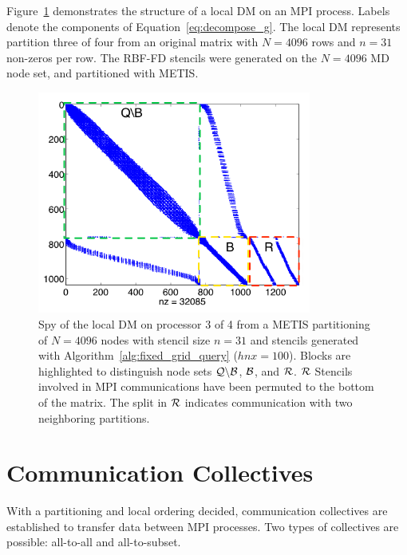 \documentclass{report}
\begin{document}
Figure~\ref{fig:decomp_spy} demonstrates the structure of a local DM on an MPI process. Labels denote the components of Equation~\ref{eq:decompose_g}. The local DM represents partition three of four from an original matrix with $N=4096$ rows and $n=31$ non-zeros per row. The RBF-FD stencils were generated on the $N=4096$ MD node set, and partitioned with METIS. 
\begin{figure}
\begin{center}
\includegraphics[width=9cm]{rbffd_methods_content/decompositions/spy_metis_stencil_example_labels.png}
\caption{Spy of the local DM on processor 3 of 4 from a METIS partitioning of $N=4096$ nodes with stencil size $n=31$ and stencils generated with Algorithm~\ref{alg:fixed_grid_query} ($hnx=100$). Blocks are highlighted to distinguish node sets $\mathcal{Q} \backslash \mathcal{B}$, $\mathcal{B}$, and $\mathcal{R}$. $\mathcal{R}$ Stencils involved in MPI communications have been permuted to the bottom of the matrix. The split in $\mathcal{R}$ indicates communication with two neighboring partitions. }
\label{fig:decomp_spy}
\end{center}
\end{figure}




\section{Communication Collectives}
\label{sec:mpi_collectives}

With a partitioning and local ordering decided, communication collectives are established to transfer data between MPI processes. Two types of collectives are possible: all-to-all and all-to-subset. 
\end{document}
